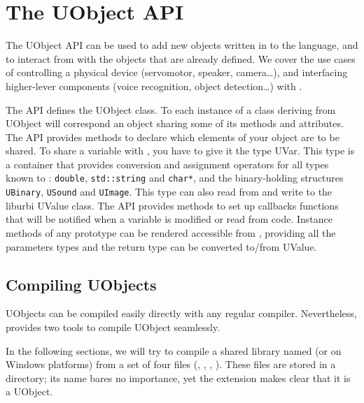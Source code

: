 
\chapter{The UObject API}
\label{sec:uob:api}

The UObject API can be used to add new objects written in \Cxx to the
\us language, and to interact from \Cxx with the objects that are
already defined. We cover the use cases of controlling a physical
device (servomotor, speaker, camera\ldots), and interfacing
higher-lever components (voice recognition, object detection\ldots)
with \urbi.

The \Cxx API defines the UObject class. To each instance of a \Cxx class
deriving from UObject will correspond an \us object sharing some of its
methods and attributes. The API provides methods to declare which elements
of your object are to be shared. To share a variable with \urbi, you have to
give it the type UVar. This type is a container that provides conversion and
assignment operators for all types known to \urbi: \lstinline{double},
\lstinline{std::string} and \lstinline{char*}, and the binary-holding
structures \lstinline{UBinary}, \lstinline{USound} and
\lstinline{UImage}. This type can also read from and write to the liburbi
UValue class. The API provides methods to set up callbacks functions that
will be notified when a variable is modified or read from \urbi
code. Instance methods of any prototype can be rendered accessible from \us,
providing all the parameters types and the return type can be converted
to/from UValue.

\section{Compiling UObjects}

UObjects can be compiled easily directly with any regular compiler.
Nevertheless, \usdk provides two tools to compile UObject seamlessly.

In the following sections, we will try to compile a shared library named
 (or  on Windows platforms) from a set of
four files (, , ,
).  These files are stored in a 
directory; its name bares no importance, yet the  extension
makes clear that it is a UObject.

